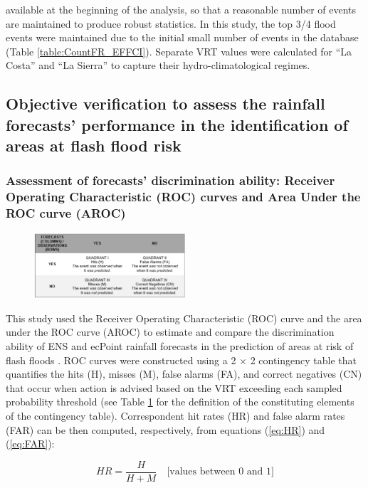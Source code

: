 \documentclass[techmemo]{ecmwfrep}%
\begin{document}
available at the beginning of the analysis, so that a reasonable number of events are maintained to produce robust statistics. In this study, the top 3/4 flood events were maintained due to the initial small number of events in the database (Table \ref{table:CountFR_EFFCI}). Separate VRT values were calculated for “La Costa” and “La Sierra” to capture their hydro-climatological regimes. 

\subsection{Objective verification to assess the rainfall forecasts’ performance in the identification of areas at flash flood risk}
\label{sec:Methods_OV}

\subsubsection{Assessment of forecasts’ discrimination ability: Receiver Operating Characteristic (ROC) curves and Area Under the ROC curve (AROC)}

\begin{figure}
\centering
{}
\includegraphics[width=0.5\textwidth]{Tables/03_CT.png}
\label{table:CT}
\end{figure}

This study used the Receiver Operating Characteristic (ROC) curve and the area under the ROC curve (AROC) to estimate and compare the discrimination ability of ENS and ecPoint rainfall forecasts in the prediction of areas at risk of flash floods \citep{Jolliffe2011}. ROC curves were constructed using a 2 × 2 contingency table that quantifies the hits (H), misses (M), false alarms (FA), and correct negatives (CN) that occur when action is advised based on the VRT exceeding each sampled probability threshold (see Table \ref{table:CT} for the definition of the constituting elements of the contingency table). Correspondent hit rates (HR) and false alarm rates (FAR) can be then computed, respectively, from equations (\ref{eq:HR}) and (\ref{eq:FAR}):

\begin{equation}
HR = \frac{H}{H+M} \quad \text{[values between 0 and 1]}
\label{eq:HR}
\end{equation}
\end{document}
